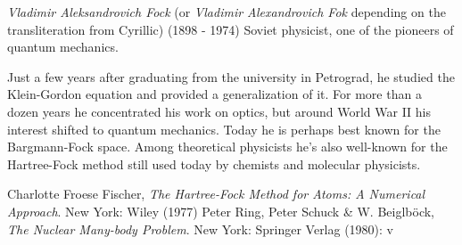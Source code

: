 \documentclass[12pt]{article}
\begin{document}
\emph{Vladimir Aleksandrovich Fock} (or \emph{Vladimir Alexandrovich Fok} depending on the transliteration from Cyrillic) (1898 - 1974) Soviet physicist, one of the pioneers of quantum mechanics.

Just a few years after graduating from the university in Petrograd, he studied the Klein-Gordon equation and provided a generalization of it. For more than a dozen years he concentrated his work on optics, but around World War II his interest shifted to quantum mechanics. Today he is perhaps best known for the Bargmann-Fock space. Among theoretical physicists he's also well-known for the Hartree-Fock method still used today by chemists and molecular physicists.

\begin{thebibliography}{2}
 Charlotte Froese Fischer, {\it The Hartree-Fock Method for Atoms: A Numerical Approach}. New York: Wiley (1977)
 Peter Ring, Peter Schuck \& W. Beiglb\"ock, {\it The Nuclear Many-body Problem}. New York: Springer Verlag (1980): v
\end{thebibliography}
\end{document}
